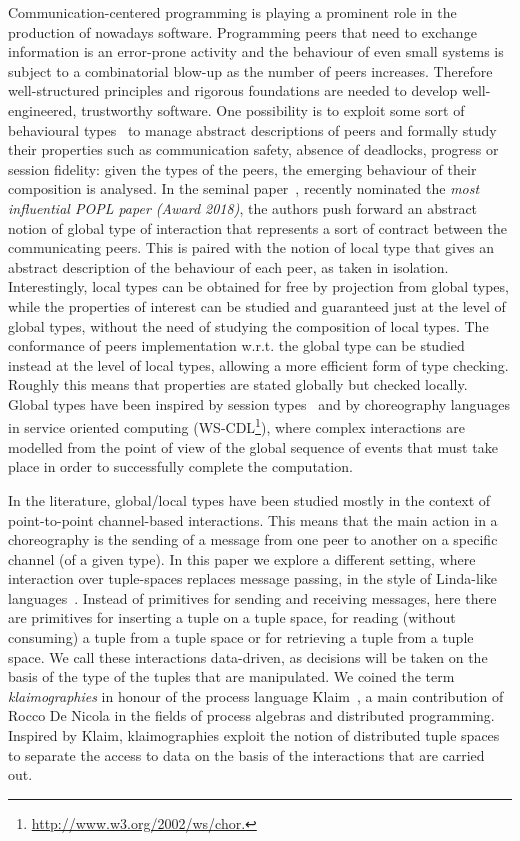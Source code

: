 
Communication-centered programming is playing a prominent role in the
production of nowadays software. Programming peers that need to
exchange information is an error-prone activity and the behaviour of
even small systems is subject to a combinatorial blow-up as the number
of peers increases.  Therefore well-structured principles and rigorous
foundations are needed to develop well-engineered, trustworthy
software.  One possibility is to exploit some sort of behavioural
types~\cite{DBLP:journals/csur/HuttelLVCCDMPRT16,dd09} to manage
abstract descriptions of peers and formally study their properties
such as communication safety, absence of deadlocks, progress or
session fidelity: given the types of the peers, the emerging behaviour
of their composition is analysed.  In the seminal
paper~\cite{DBLP:conf/popl/HondaYC08}, recently nominated the
\emph{most influential POPL paper (Award 2018)}, the authors push
forward an abstract notion of global type of interaction that
represents a sort of contract between the communicating peers. This is
paired with the notion of local type that gives an abstract
description of the behaviour of each peer, as taken in isolation.
Interestingly, local types can be obtained for free by projection from
global types, while the properties of interest can be studied and
guaranteed just at the level of global types, without the need of
studying the composition of local types. The conformance of peers
implementation w.r.t. the global type can be studied instead at the
level of local types, allowing a more efficient form of type
checking. Roughly this means that properties are stated globally but
checked locally. Global types have been inspired by session
types~\cite{DBLP:conf/esop/HondaVK98} and by choreography languages in
service oriented computing
(WS-CDL\footnote{\url{http://www.w3.org/2002/ws/chor.}}), where
complex interactions are modelled from the point of view of the global
sequence of events that must take place in order to successfully
complete the computation.

In the literature, global/local types have been studied mostly in the
context of point-to-point channel-based interactions. This means that
the main action in a choreography is the sending of a message from one
peer to another on a specific channel (of a given type). In this paper
we explore a different setting, where interaction over tuple-spaces
replaces message passing, in the style of Linda-like
languages~\cite{DBLP:journals/toplas/Gelernter85}.  Instead of
primitives for sending and receiving messages, here there are
primitives for inserting a tuple on a tuple space, for reading
(without consuming) a tuple from a tuple space or for retrieving a
tuple from a tuple space. We call these interactions data-driven, as
decisions will be taken on the basis of the type of the tuples that
are manipulated.
%
We coined the term \emph{klaimographies} in honour of the process
language Klaim~\cite{DBLP:journals/tse/NicolaFP98,klaim}, a main
contribution of Rocco De Nicola in the fields of process algebras and
distributed programming.
%
Inspired by Klaim, klaimographies exploit the notion of distributed
tuple spaces to separate the access to data on the basis of the
interactions that are carried out.

